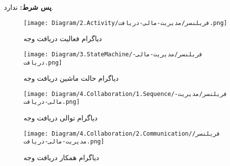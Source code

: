 \noindent
\textbf{پس شرط:}
ندارد.



\begin{figure}[H]
	\texttt{[image: Diagram/2.Activity/فریلنسر/مدیریت-مالی-دریافت.png]}
	\centering
	\caption{دیاگرام فعالیت دریافت وجه}
	\label{fig:a:دریافت-وجه}
\end{figure}
\begin{figure}[H]
	\texttt{[image: Diagram/3.StateMachine/فریلنسر/مدیریت-مالی-دریافت.png]}
	\centering
	\caption{دیاگرام حالت ماشین دریافت وجه}
	\label{fig:sm:دریافت-وجه}
\end{figure}
\begin{figure}[H]
	\texttt{[image: Diagram/4.Collaboration/1.Sequence/فریلنسر/مدیریت-مالی-دریافت.png]}
	\caption{دیاگرام توالی دریافت وجه}
	\centering
	\label{fig:s:دریافت-وجه}
\end{figure}
\begin{figure}[H]
	\texttt{[image: Diagram/4.Collaboration/2.Communication/فریلنسر/مدیریت-مالی-دریافت.png]}
	\centering
	\caption{دیاگرام همکار دریافت وجه}
	\label{fig:c:دریافت-وجه}
\end{figure}
